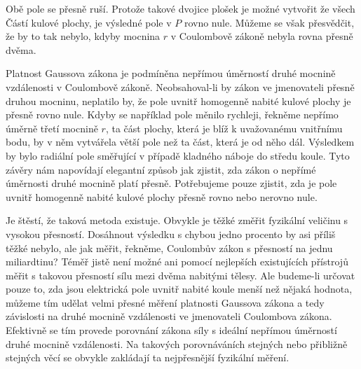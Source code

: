       Obě pole se přesně ruší. Protože takové dvojice plošek je možné vytvořit že všech Částí kulové plochy, 
      je výsledné pole v \(P\) rovno nule. Můžeme se však přesvědčit, že by to tak nebylo, kdyby mocnina 
      \(r\) v Coulombově zákoně nebyla rovna přesně dvěma.
      
      Platnost Gaussova zákona je podmíněna nepřímou úměrností druhé mocnině vzdálenosti v Coulombově zákoně. 
      Neobsahoval-li by zákon ve jmenovateli přesně druhou mocninu, neplatilo by, že pole uvnitř homogenně 
      nabité kulové plochy je přesně rovno nule. Kdyby se například pole měnilo rychleji, řekněme nepřímo 
      úměrně třetí mocnině \(r\), ta část plochy, která je blíž k uvažovanému vnitřnímu bodu, by v něm 
      vytvářela větší pole než ta část, která je od něho dál. Výsledkem by bylo radiální pole směřující v 
      případě kladného náboje do středu koule. Tyto závěry nám napovídají elegantní způsob jak zjistit, zda 
      zákon o nepřímé úměrnosti druhé mocnině platí přesně. Potřebujeme pouze zjistit, zda je pole uvnitř 
      homogenně nabité kulové plochy přesně rovno nebo nerovno nule.
      
      Je štěstí, že taková metoda existuje. Obvykle je těžké změřit fyzikální veličinu s vysokou přesností. 
      Dosáhnout výsledku s chybou jedno procento by asi příliš těžké nebylo, ale jak měřit, řekněme, 
      Coulombův zákon s přesností na jednu miliardtinu? Téměř jistě není možné ani pomocí nejlepších 
      existujících přístrojů měřit s takovou přesností sílu mezi dvěma nabitými tělesy. Ale budeme-li určovat 
      pouze to, zda jsou elektrická pole uvnitř nabité koule menší než nějaká hodnota, můžeme tím udělat 
      velmi přesné měření platnosti Gaussova zákona a tedy závislosti na druhé mocnině vzdálenosti ve 
      jmenovateli Coulombova zákona. Efektivně se tím provede porovnání zákona síly s ideální nepřímou 
      úměrností druhé mocnině vzdálenosti. Na takových porovnáváních stejných nebo přibližně stejných věcí 
      se obvykle zakládají ta nejpřesnější fyzikální měření.
      
